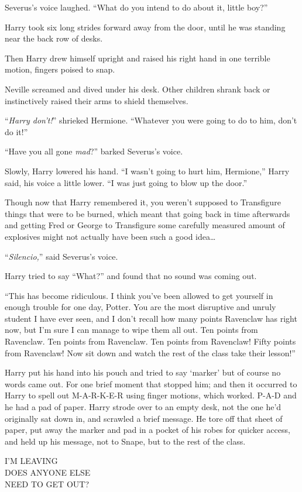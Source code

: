 Severus’s voice laughed. “What do you intend to do about it, little boy?”

Harry took six long strides forward away from the door, until he was standing near the back row of desks.

Then Harry drew himself upright and raised his right hand in one terrible motion, fingers poised to snap.

Neville screamed and dived under his desk. Other children shrank back or instinctively raised their arms to shield themselves.

“\emph{Harry don’t!}” shrieked Hermione. “Whatever you were going to do to him, don’t do it!”

“Have you all gone \emph{mad}?” barked Severus’s voice.

Slowly, Harry lowered his hand. “I wasn’t going to hurt him, Hermione,” Harry said, his voice a little lower. “I was just going to blow up the door.”

Though now that Harry remembered it, you weren’t supposed to Transfigure things that were to be burned, which meant that going back in time afterwards and getting Fred or George to Transfigure some carefully measured amount of explosives might not actually have been such a good idea…

“\emph{Silencio,}” said Severus’s voice.

Harry tried to say “What?” and found that no sound was coming out.

“This has become ridiculous. I think you’ve been allowed to get yourself in enough trouble for one day, Potter. You are the most disruptive and unruly student I have ever seen, and I don’t recall how many points Ravenclaw has right now, but I’m sure I can manage to wipe them all out. Ten points from Ravenclaw. Ten points from Ravenclaw. Ten points from Ravenclaw! Fifty points from Ravenclaw! Now sit down and watch the rest of the class take their lesson!”

Harry put his hand into his pouch and tried to say ‘marker’ but of course no words came out. For one brief moment that stopped him; and then it occurred to Harry to spell out M-A-R-K-E-R using finger motions, which worked. P-A-D and he had a pad of paper. Harry strode over to an empty desk, not the one he’d originally sat down in, and scrawled a brief message. He tore off that sheet of paper, put away the marker and pad in a pocket of his robes for quicker access, and held up his message, not to Snape, but to the rest of the class.

\begin{writtenNote}
I’M LEAVING\\
DOES ANYONE ELSE\\
NEED TO GET OUT?
\end{writtenNote}

